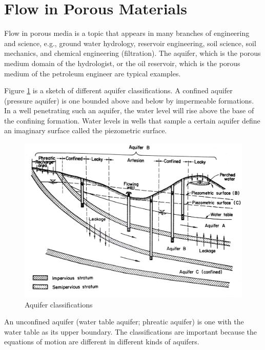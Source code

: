 \section{Flow in Porous Materials}
Flow in porous media is a topic that appears in many branches of engineering and science, e.g., ground water hydrology, reservoir engineering, soil science, soil mechanics, and chemical engineering (filtration).
The aquifer, which is the porous medium domain of the hydrologist, or the oil reservoir, which is the porous medium of the petroleum engineer are typical examples.

Figure \ref{fig:aquifers} is a sketch of different aquifer classifications. 
A confined aquifer (pressure aquifer) is one bounded above and below by impermeable formations.
In a well penetrating such an aquifer, the water level will rise above the base of the confining formation.
Water levels in wells that sample a certain aquifer define an imaginary surface called the piezometric surface.

\begin{figure}[h!] %
   \centering
   \includegraphics[width=6in]{./16-PorousMediumFlow/aquifers.jpg} 
   \caption{Aquifer classifications}
   \label{fig:aquifers}
\end{figure}

An unconfined aquifer (water table aquifer; phreatic aquifer) is one with the water table as its upper boundary.
The classifications are important because the equations of motion are different in different kinds of aquifers.

